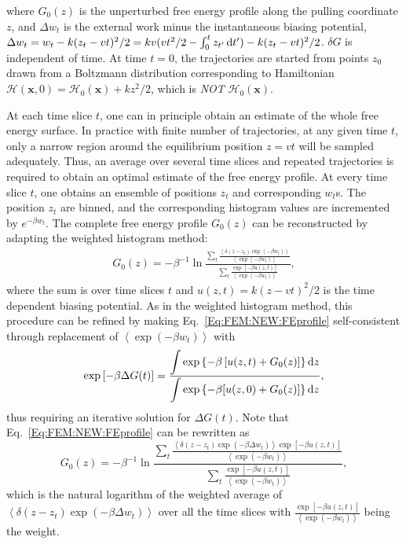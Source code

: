 where $G_0(z)$ is the unperturbed free energy profile along the pulling coordinate $z$, and $\Delta w_t$ is the external work minus the instantaneous biasing potential, $\Delta w_t=w_t-k(z_t-vt)^2/2=kv(vt^2/2-\int_0^t z_{t^\prime}\mathop{}\!\mathrm{d} t^\prime)-k(z_t-vt)^2/2$. %
$\delta G$ is independent of time.
At time $t=0$, the trajectories are started from points $z_0$ drawn from a Boltzmann distribution corresponding to Hamiltonian $\mathscr{H}(\mathbf{x},0)=\mathscr{H}_0(\mathbf{x})+kz^2/2$, which is \emph{NOT} $\mathscr{H}_0(\mathbf{x})$.

At each time slice $t$, one can in principle obtain an estimate of the whole free energy surface. In practice with finite number of trajectories, at any given time $t$, only a narrow region around the equilibrium position $z=vt$ will be sampled adequately. Thus, an average over several time slices and repeated trajectories is required to obtain an optimal estimate of the free energy profile. At every time slice $t$, one obtains an ensemble of positions $z_t$ and corresponding $w_t$s. The position $z_t$ are binned, and the corresponding histogram values are incremented by $e^{-\beta w_t}$. The complete free energy profile $G_0(z)$ can be reconstructed by adapting the weighted histogram method:
\begin{align}
	G_0(z)=-\beta^{-1}\ln{\frac{\sum_t \frac{\left<\delta(z-z_t)\exp{(-\beta w_t)}\right>}{\left<\exp{(-\beta w_t)}\right>}}{\sum_t\frac{\exp{[-\beta u(z,t)]}}{\left<\exp{(-\beta w_t)}\right>}}},
	\label{Eq:FEM:NEW:FEprofile}
\end{align}
where the sum is over time slices $t$ and $u(z,t)=k(z-vt)^2/2$ is the time dependent biasing potential. As in the weighted histogram method, this procedure can be refined by making Eq.~\ref{Eq:FEM:NEW:FEprofile} self-consistent through replacement of $\left<\exp{(-\beta w_t)}\right>$ with
\begin{equation}
	\exp{[-\beta \Delta G(t)]}=\frac{\displaystyle\int \exp{\left\{-\beta \left[u(z,t)+G_0(z)\right]\right\}}\mathop{}\!\mathrm{d} z}{\displaystyle\int \exp{\left\{-\beta[u(z,0)+G_0(z)]\right\}\mathop{}\!\mathrm{d}z}},
\end{equation}
thus requiring an iterative solution for $\Delta G(t)$. Note that Eq.~\ref{Eq:FEM:NEW:FEprofile} can be rewritten as
\begin{equation}
	G_0(z)=-\beta^{-1}\ln{\frac{\sum_t \frac{\left<\delta(z-z_t)\exp{(-\beta \Delta w_t)}\right>\exp{[-\beta u(z,t)]}}{\left<\exp{(-\beta w_t)}\right>}}{\sum_t\frac{\exp{[-\beta u(z,t)]}}{\left<\exp{(-\beta w_t)}\right>}}},
\end{equation}
which is the natural logarithm of the weighted average of $\left<\delta(z-z_t)\exp{(-\beta \Delta w_t)}\right>$ over all the time slices with $\frac{\exp{[-\beta u(z,t)]}}{\left<\exp{(-\beta w_t)}\right>}$ being the weight.